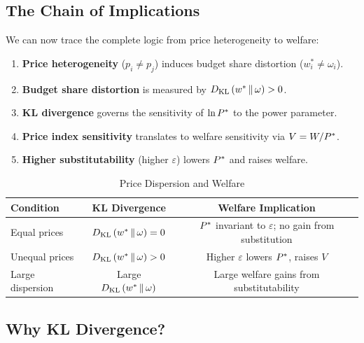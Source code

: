 \subsection{The Chain of Implications}
\label{subsec:chain}

We can now trace the complete logic from price heterogeneity to welfare:

\begin{enumerate}[leftmargin=2em]
    \item \textbf{Price heterogeneity} ($p_i \neq p_j$) induces budget share distortion ($w_i^* \neq \omega_i$).
    
    \item \textbf{Budget share distortion} is measured by $D_{\mathrm{KL}}\left(w^* \,\|\, \omega\right) > 0$.
    
    \item \textbf{KL divergence} governs the sensitivity of $\ln P^{*}$ to the power parameter.
    
    \item \textbf{Price index sensitivity} translates to welfare sensitivity via $V = W/P^{*}$.
    
    \item \textbf{Higher substitutability} (higher $\varepsilon$) lowers $P^{*}$ and raises welfare.
\end{enumerate}

\begin{table}[H]
\centering
\caption{Price Dispersion and Welfare}
\label{tab:kl-welfare}
\renewcommand{\arraystretch}{1.4}
\begin{tabular}{@{}lcc@{}}
\toprule
\textbf{Condition} & \textbf{KL Divergence} & \textbf{Welfare Implication} \\
\midrule
Equal prices & $D_{\mathrm{KL}}\left(w^* \,\|\, \omega\right) = 0$ & $P^{*}$ invariant to $\varepsilon$; no gain from substitution \\[2pt]
Unequal prices & $D_{\mathrm{KL}}\left(w^* \,\|\, \omega\right) > 0$ & Higher $\varepsilon$ lowers $P^{*}$, raises $V$ \\[2pt]
Large dispersion & Large $D_{\mathrm{KL}}\left(w^* \,\|\, \omega\right)$ & Large welfare gains from substitutability \\
\bottomrule
\end{tabular}
\end{table}

\subsection{Why KL Divergence?}
\label{subsec:why-kl}

